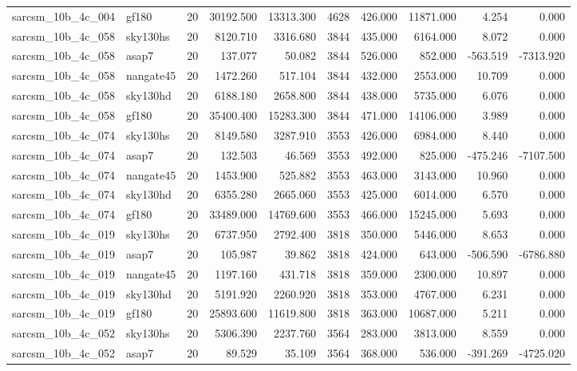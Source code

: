 \begin{tabular}{llrrrrrrrr}
sarcsm\_10b\_4c\_004 & gf180 & 20 & 30192.500 & 13313.300 & 4628 & 426.000 & 11871.000 & 4.254 & 0.000 \\
sarcsm\_10b\_4c\_058 & sky130hs & 20 & 8120.710 & 3316.680 & 3844 & 435.000 & 6164.000 & 8.072 & 0.000 \\
sarcsm\_10b\_4c\_058 & asap7 & 20 & 137.077 & 50.082 & 3844 & 526.000 & 852.000 & -563.519 & -7313.920 \\
sarcsm\_10b\_4c\_058 & nangate45 & 20 & 1472.260 & 517.104 & 3844 & 432.000 & 2553.000 & 10.709 & 0.000 \\
sarcsm\_10b\_4c\_058 & sky130hd & 20 & 6188.180 & 2658.800 & 3844 & 438.000 & 5735.000 & 6.076 & 0.000 \\
sarcsm\_10b\_4c\_058 & gf180 & 20 & 35400.400 & 15283.300 & 3844 & 471.000 & 14106.000 & 3.989 & 0.000 \\
sarcsm\_10b\_4c\_074 & sky130hs & 20 & 8149.580 & 3287.910 & 3553 & 426.000 & 6984.000 & 8.440 & 0.000 \\
sarcsm\_10b\_4c\_074 & asap7 & 20 & 132.503 & 46.569 & 3553 & 492.000 & 825.000 & -475.246 & -7107.500 \\
sarcsm\_10b\_4c\_074 & nangate45 & 20 & 1453.900 & 525.882 & 3553 & 463.000 & 3143.000 & 10.960 & 0.000 \\
sarcsm\_10b\_4c\_074 & sky130hd & 20 & 6355.280 & 2665.060 & 3553 & 425.000 & 6014.000 & 6.570 & 0.000 \\
sarcsm\_10b\_4c\_074 & gf180 & 20 & 33489.000 & 14769.600 & 3553 & 466.000 & 15245.000 & 5.693 & 0.000 \\
sarcsm\_10b\_4c\_019 & sky130hs & 20 & 6737.950 & 2792.400 & 3818 & 350.000 & 5446.000 & 8.653 & 0.000 \\
sarcsm\_10b\_4c\_019 & asap7 & 20 & 105.987 & 39.862 & 3818 & 424.000 & 643.000 & -506.590 & -6786.880 \\
sarcsm\_10b\_4c\_019 & nangate45 & 20 & 1197.160 & 431.718 & 3818 & 359.000 & 2300.000 & 10.897 & 0.000 \\
sarcsm\_10b\_4c\_019 & sky130hd & 20 & 5191.920 & 2260.920 & 3818 & 353.000 & 4767.000 & 6.231 & 0.000 \\
sarcsm\_10b\_4c\_019 & gf180 & 20 & 25893.600 & 11619.800 & 3818 & 363.000 & 10687.000 & 5.211 & 0.000 \\
sarcsm\_10b\_4c\_052 & sky130hs & 20 & 5306.390 & 2237.760 & 3564 & 283.000 & 3813.000 & 8.559 & 0.000 \\
sarcsm\_10b\_4c\_052 & asap7 & 20 & 89.529 & 35.109 & 3564 & 368.000 & 536.000 & -391.269 & -4725.020 \\

\end{tabular}
